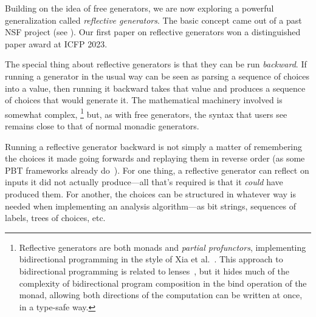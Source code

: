  Building on the
idea of free generators, we are now exploring a powerful
generalization called {\em reflective
  generators}.  The basic concept came out of a
past NSF project (see ). Our first paper on
reflective generators won a distinguished paper award at ICFP 2023.

The special thing about reflective generators is that they can be run
{\em backward}.
If running a generator in the usual way can be seen as parsing a
sequence of choices into a
value, then running it backward takes that value and produces a
sequence of choices that
would generate it.
The mathematical machinery
involved is somewhat complex,%
\footnote{\normalsize Reflective generators are both monads and {\em
    partial profunctors},
implementing bidirectional programming in the style of Xia et
al.~\cite{xia2019composing}. This approach to bidirectional programming is
related to lenses~\cite{foster2009bidirectional}, but it hides much of the
complexity of bidirectional program composition in the bind operation of the
monad, allowing both directions of
the computation can be written at once, in a type-safe way.}
but, as with free generators, the syntax that users see remains close to
that of normal monadic generators.

Running a reflective generator backward is not simply a matter of
remembering the choices it made going forwards and replaying them in
reverse order (as some PBT frameworks already do~\cite{maciver2019hypothesis,
  hatfield-dodds_hypofuzz_nodate}). For one thing, a reflective
generator can reflect on inputs it did not actually
produce---all that's required is that it {\em could} have produced
them.  For another, the choices can be structured in whatever way is needed 
when implementing an analysis algorithm---as bit
strings, sequences of labels, trees of choices, etc.

